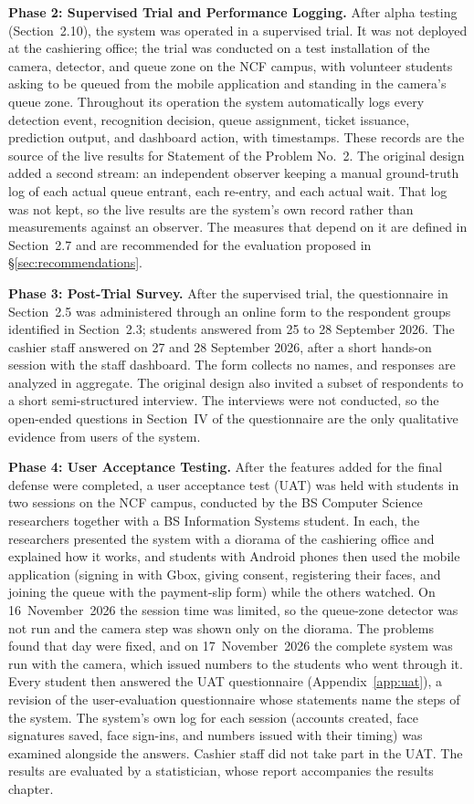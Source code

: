 \documentclass{research}
\begin{document}
\textbf{Phase 2: Supervised Trial and Performance Logging.} After alpha
testing (Section~2.10), the system was operated in a supervised trial.
It was not deployed at the cashiering office; the trial was conducted on
a test installation of the camera, detector, and queue zone on the NCF
campus, with
volunteer students asking to be queued from the mobile application and
standing in the camera's queue zone. Throughout its operation
the system
automatically logs every detection event, recognition decision, queue
assignment, ticket issuance, prediction output, and dashboard action,
with timestamps. These records are the source of the live results for
Statement of the Problem No.~2. The original design added a second
stream: an independent observer keeping a manual ground-truth log of
each actual queue entrant, each re-entry, and each actual wait. That log
was not kept, so the live results are the system's own record rather
than measurements against an observer. The measures that depend on it
are defined in Section~2.7 and are recommended for the evaluation
proposed in \S\ref{sec:recommendations}.

\textbf{Phase 3: Post-Trial Survey.} After the supervised
trial, the questionnaire in Section~2.5 was administered through an
online form to the respondent groups identified in Section~2.3;
students answered from 25 to 28 September 2026. The cashier staff
answered on 27 and 28 September 2026, after a short hands-on session
with the staff dashboard. The form collects
no names, and responses are analyzed in aggregate. The original design also invited a subset of respondents to
a short semi-structured interview. The interviews were not conducted,
so the open-ended questions in Section~IV of the questionnaire are the
only qualitative evidence from users of the system.

\textbf{Phase 4: User Acceptance Testing.}\label{cr:uat} After the features added for
the final defense were completed, a user acceptance test (UAT) was
held with students in two sessions on the NCF campus, conducted by
the BS Computer Science researchers together with a BS Information
Systems student. In each, the researchers presented the
system with a diorama of the cashiering office and explained how it
works, and students with Android phones then used the mobile
application (signing in with Gbox, giving consent, registering their
faces, and joining the queue with the payment-slip form) while the
others watched. On 16~November~2026 the session time was limited, so
the queue-zone detector was not run and the camera step was shown only
on the diorama. The problems found that day were fixed, and on
17~November~2026 the complete system was run with the camera, which
issued numbers to the students who went through it. Every student then
answered the UAT questionnaire (Appendix~\ref{app:uat}), a revision of
the user-evaluation questionnaire whose statements name the steps of the
system. The system's own log for each session (accounts created, face
signatures saved, face sign-ins, and numbers issued with their timing)
was examined alongside the answers. Cashier staff did not take part in
the UAT. The results are evaluated by a statistician, whose report
accompanies the results chapter.
\end{document}
